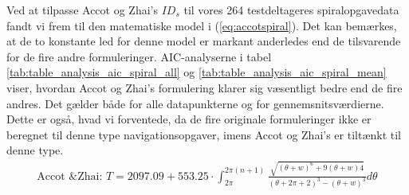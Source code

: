\begin{minipage}{\linewidth}
\begin{minipage}[b]{0.45\linewidth}
		\label{fig:spiralingtest2}
	\end{minipage}
\end{minipage}

\newpage
Ved at tilpasse Accot og Zhai's $ID_s$ til vores 264 testdeltageres spiralopgavedata fandt vi frem til den matematiske model i (\ref{eq:accotspiral}). Det kan bemærkes, at de to konstante led for denne model er markant anderledes end de tilsvarende for de fire andre formuleringer.  AIC-analyserne i tabel \ref{tab:table_analysis_aic_spiral_all} og \ref{tab:table_analysis_aic_spiral_mean} viser, hvordan Accot og Zhai's formulering klarer sig væsentligt bedre end de fire andres. Det gælder både for alle datapunkterne og for gennemsnitsværdierne. Dette er også, hvad vi forventede, da de fire originale formuleringer ikke er beregnet til denne type navigationsopgaver, imens Accot og Zhai's er tiltænkt til denne type.
\begin{align}
\text{Accot \& Zhai: } T = 2097.09+553.25 \cdot \int_{2\pi}^{2\pi(n+1)}\frac{\sqrt{\left(\theta+w\right)^6+9\left(\theta+w\right)4}}{\left(\theta+2\pi+2\right)^3-\left(\theta+w\right)^3}d\theta
\label{eq:accotspiral}
\end{align}

